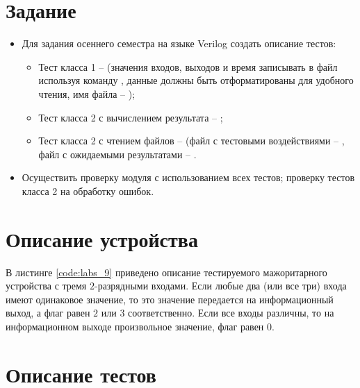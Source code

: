 





\tableofcontents
\lstlistoflistings
\listoffigures
\newpage

\section{Задание}

\begin{itemize}
	\item Для задания  осеннего семестра на языке Verilog создать описание тестов:
		\begin{itemize}
			\item Тест класса 1 --  (значения входов, выходов и время записывать в файл используя команду , данные должны быть отформатированы для удобного чтения, имя файла -- );
			\item Тест класса 2 с вычислением результата -- ;
			\item Тест класса 2 с чтением файлов --  (файл с тестовыми воздействиями -- , файл с ожидаемыми результатами -- .
		\end{itemize}

	\item Осуществить проверку модуля с использованием всех тестов; проверку тестов класса 2 на обработку ошибок.
\end{itemize}

\section{Описание устройства}

В листинге \ref{code:labs_9} приведено описание тестируемого мажоритарного устройства с тремя $2$-разрядными входами. Если любые два (или все три) входа имеют одинаковое значение, то это значение передается на информационный выход, а флаг равен $2$ или $3$ соответственно. Если все входы различны, то на информационном выходе произвольное значение, флаг равен $0$.


\section{Описание тестов}
\label{sec:tests}

